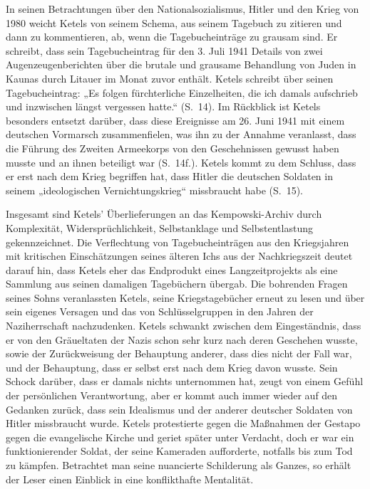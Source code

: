 \begin{multicols*}{2}
In seinen Betrachtungen über den Nationalsozialismus, Hitler und den Krieg von 1980 weicht Ketels von seinem Schema, aus seinem Tagebuch zu zitieren und dann zu kommentieren, ab, wenn die Tagebucheinträge zu grausam sind. Er schreibt, dass sein Tagebucheintrag für den 3. Juli 1941 Details von zwei Augenzeugenberichten über die brutale und grausame Behandlung von Juden in Kaunas durch Litauer im Monat zuvor enthält. Ketels schreibt über seinen Tagebucheintrag: „Es folgen fürchterliche Einzelheiten, die ich damals aufschrieb und inzwischen längst vergessen hatte.“ (S. 14). Im Rückblick ist Ketels besonders entsetzt darüber, dass diese Ereignisse am 26. Juni 1941 mit einem deutschen Vormarsch zusammenfielen, was ihn zu der Annahme veranlasst, dass die Führung des Zweiten Armeekorps von den Geschehnissen gewusst haben musste und an ihnen beteiligt war (S. 14f.). Ketels kommt zu dem Schluss, dass er erst nach dem Krieg begriffen hat, dass Hitler die deutschen Soldaten in seinem „ideologischen Vernichtungskrieg“ missbraucht habe (S. 15).

Insgesamt sind Ketels’ Überlieferungen an das Kempowski-Archiv durch Komplexität, Widersprüchlichkeit, Selbstanklage und Selbstentlastung gekennzeichnet. Die Verflechtung von Tagebucheinträgen aus den Kriegsjahren mit kritischen Einschätzungen seines älteren Ichs aus der Nachkriegszeit deutet darauf hin, dass Ketels eher das Endprodukt eines Langzeitprojekts als eine Sammlung aus seinen damaligen Tagebüchern übergab. Die bohrenden Fragen seines Sohns veranlassten Ketels, seine Kriegstagebücher erneut zu lesen und über sein eigenes Versagen und das von Schlüsselgruppen in den Jahren der Naziherrschaft nachzudenken. Ketels schwankt zwischen dem Eingeständnis, dass er von den Gräueltaten der Nazis schon sehr kurz nach deren Geschehen wusste, sowie der Zurückweisung der Behauptung anderer, dass dies nicht der Fall war, und der Behauptung, dass er selbst erst nach dem Krieg davon wusste. Sein Schock darüber, dass er damals nichts unternommen hat, zeugt von einem Gefühl der persönlichen Verantwortung, aber er kommt auch immer wieder auf den Gedanken zurück, dass sein Idealismus und der anderer deutscher Soldaten von Hitler missbraucht wurde. Ketels protestierte gegen die Maßnahmen der Gestapo gegen die evangelische Kirche und geriet später unter Verdacht, doch er war ein funktionierender Soldat, der seine Kameraden aufforderte, notfalls bis zum Tod zu kämpfen. Betrachtet man seine nuancierte Schilderung als Ganzes, so erhält der Leser einen Einblick in eine konflikthafte Mentalität.


\end{multicols*}
